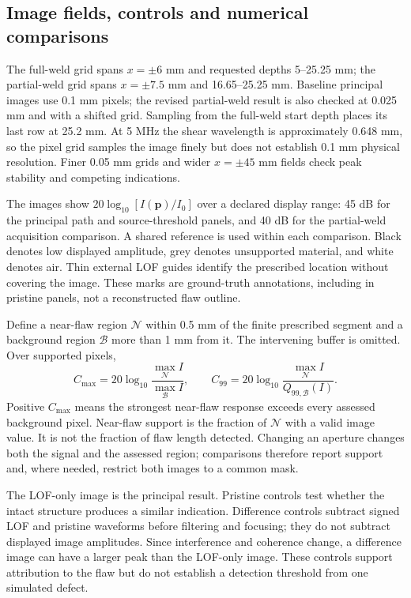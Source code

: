 \subsection{Image fields, controls and numerical comparisons}
\label{saftapp:metrics}
The full-weld grid spans $x=\pm6$ mm and requested depths 5--25.25 mm; the partial-weld grid spans $x=\pm7.5$ mm and 16.65--25.25 mm. Baseline principal images use 0.1 mm pixels; the revised partial-weld result is also checked at 0.025 mm and with a shifted grid. Sampling from the full-weld start depth places its last row at 25.2 mm. At 5 MHz the shear wavelength is approximately 0.648 mm, so the pixel grid samples the image finely but does not establish 0.1 mm physical resolution. Finer 0.05 mm grids and wider $x=\pm45$ mm fields check peak stability and competing indications.

The images show $20\log_{10}[I(\mathbf p)/I_0]$ over a declared display range: 45 dB for the principal path and source-threshold panels, and 40 dB for the partial-weld acquisition comparison. A shared reference is used within each comparison. Black denotes low displayed amplitude, grey denotes unsupported material, and white denotes air. Thin external LOF guides identify the prescribed location without covering the image. These marks are ground-truth annotations, including in pristine panels, not a reconstructed flaw outline.

Define a near-flaw region $\mathcal N$ within 0.5 mm of the finite prescribed segment and a background region $\mathcal B$ more than 1 mm from it. The intervening buffer is omitted. Over supported pixels,
\begin{equation}
 C_{\max}=20\log_{10}\frac{\max_{\mathcal N}I}{\max_{\mathcal B}I},\qquad
 C_{99}=20\log_{10}\frac{\max_{\mathcal N}I}{Q_{99,\mathcal B}(I)}.
\end{equation}
Positive $C_{\max}$ means the strongest near-flaw response exceeds every assessed background pixel. Near-flaw support is the fraction of $\mathcal N$ with a valid image value. It is not the fraction of flaw length detected. Changing an aperture changes both the signal and the assessed region; comparisons therefore report support and, where needed, restrict both images to a common mask.

The LOF-only image is the principal result. Pristine controls test whether the intact structure produces a similar indication. Difference controls subtract signed LOF and pristine waveforms before filtering and focusing; they do not subtract displayed image amplitudes. Since interference and coherence change, a difference image can have a larger peak than the LOF-only image. These controls support attribution to the flaw but do not establish a detection threshold from one simulated defect.

